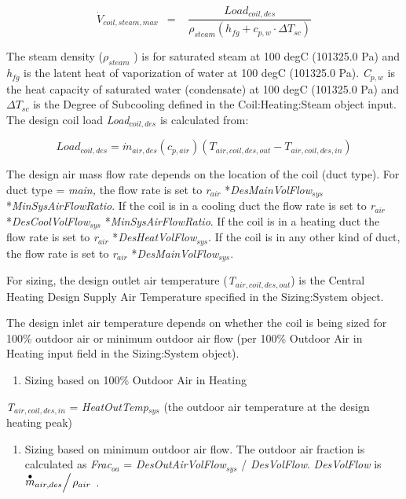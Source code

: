\begin{equation}
{\dot V_{coil,steam,max}}\,\,\, = \,\,\,\,\,\frac{{Loa{d_{coil,des}}}}{{{\rho_{steam}}\left( {{h_{fg}} + {c_{p,w}}\cdot \Delta {T_{sc}}} \right)}}
\end{equation}

The steam density (\({\rho_{steam}}\) ) is for saturated steam at 100 degC (101325.0 Pa) and \emph{h\(_{fg}\)} is the latent heat of vaporization of water at 100 degC (101325.0 Pa). \emph{C\(_{p,w}\)} is the heat capacity of saturated water (condensate) at 100 degC (101325.0 Pa) and \(\Delta {T_{sc}}\) is the Degree of Subcooling defined in the Coil:Heating:Steam object input. The design coil load \emph{Load\(_{coil,des}\)} is calculated from:

\begin{equation}
Loa{d_{coil,des}} = {\dot m_{air,des}}({c_{p,air}})({T_{air,coil,des,out}} - {T_{air,coil,des,in}})
\end{equation}

The design air mass flow rate depends on the location of the coil (duct type). For duct type = \emph{main,} the flow rate is set to \emph{r\(_{air}\)} *\emph{DesMainVolFlow\(_{sys}\)} *\emph{MinSysAirFlowRatio}. If the coil is in a cooling duct the flow rate is set to \emph{r\(_{air}\)} *\emph{DesCoolVolFlow\(_{sys}\)} *\emph{MinSysAirFlowRatio}. If the coil is in a heating duct the flow rate is set to \emph{r\(_{air}\)} *\emph{DesHeatVolFlow\(_{sys}\)}. If the coil is in any other kind of duct, the flow rate is set to \emph{r\(_{air}\)} *\emph{DesMainVolFlow\(_{sys}\)}.

For sizing, the design outlet air temperature (\emph{T\(_{air,coil,des,out}\)}) is the Central Heating Design Supply Air Temperature specified in the Sizing:System object.

The design inlet air temperature depends on whether the coil is being sized for 100\% outdoor air or minimum outdoor air flow (per 100\% Outdoor Air in Heating input field in the Sizing:System object).

\begin{enumerate}
\def\labelenumi{\arabic{enumi})}
\tightlist
\item
  Sizing based on 100\% Outdoor Air in Heating
\end{enumerate}

\emph{T\(_{air,coil,des,in}\)} = \emph{HeatOutTemp\(_{sys}\)} (the outdoor air temperature at the design heating peak)

\begin{enumerate}
\def\labelenumi{\arabic{enumi})}
\setcounter{enumi}{1}
\tightlist
\item
  Sizing based on minimum outdoor air flow. The outdoor air fraction is calculated as \emph{Frac}\(_{oa}\) = \emph{DesOutAirVolFlow\(_{sys}\)} / \emph{DesVolFlow}. \emph{DesVolFlow} is \({{{{\mathop m\limits^ \bullet }_{air,des}}} \mathord{\left/ {\vphantom {{{{\mathop m\limits^ \bullet }_{air,des}}} {{\rho_{air}}}}} \right. } {{\rho_{air}}}}\) \emph{.}
\end{enumerate}

